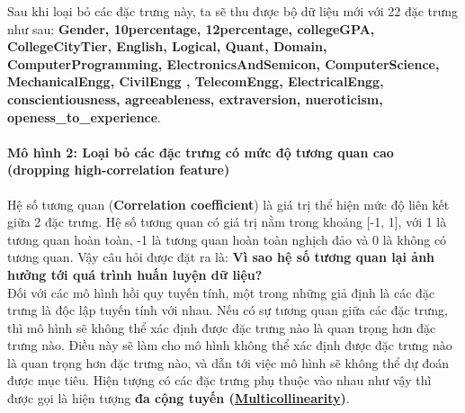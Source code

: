 \documentclass{report}
\begin{document}
    Sau khi loại bỏ các đặc trưng này, ta sẽ thu được bộ dữ liệu mới với 22 đặc trưng như sau:
    \textbf{Gender, 10percentage, 12percentage, collegeGPA, CollegeCityTier, English, Logical, Quant, Domain, ComputerProgramming, ElectronicsAndSemicon, ComputerScience, MechanicalEngg, CivilEngg , TelecomEngg, ElectricalEngg, conscientiousness, agreeableness, extraversion, nueroticism, openess\_to\_experience}.        
    
    \pagebreak
        \paragraph{Mô hình 2: Loại bỏ các đặc trưng có mức độ tương quan cao (dropping high-correlation feature)}\label{sec:dropping-correlation-feature}
    Hệ số tương quan (\textbf{Correlation coefficient}) là giá trị thể hiện mức độ liên kết giữa 2 đặc trưng. Hệ số tương quan có giá trị nằm trong khoảng [-1, 1], với 1 là tương quan hoàn toàn, -1 là tương quan hoàn toàn nghịch đảo và 0 là không có tương quan. Vậy câu hỏi được đặt ra là: \textbf{Vì sao hệ số tương quan lại ảnh hưởng tới quá trình huấn luyện dữ liệu?}\\ 
    
    Đối với các mô hình hồi quy tuyến tính, một trong những giả định là các đặc trưng là độc lập tuyến tính với nhau. Nếu có sự tương quan giữa các đặc trưng, thì mô hình sẽ không thể xác định được đặc trưng nào là quan trọng hơn đặc trưng nào. Điều này sẽ làm cho mô hình không thể xác định được đặc trưng nào là quan trọng hơn đặc trưng nào, và dẫn tới việc mô hình sẽ không thể dự đoán được mục tiêu. Hiện tượng có các đặc trưng phụ thuộc vào nhau như vậy thì được gọi là hiện tượng \textbf{đa cộng tuyến (\href{https://en.wikipedia.org/wiki/Multicollinearity}{Multicollinearity})}.\\
\end{document}
